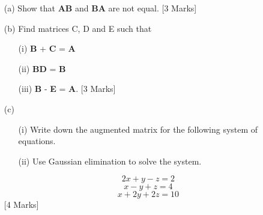 \documentclass[a4paper,12pt]{article}
\begin{document}
\begin{itemize}
\item[(a)] Show that \textbf{AB} and \textbf{BA} are not equal. [3 Marks]
\item[(b)] Find matrices C, D and E such that
\begin{itemize}
\item[(i)] \textbf{B} + \textbf{C} = \textbf{A}
\item[(ii)] \textbf{BD} = \textbf{B}
\item[(iii)] \textbf{B} - \textbf{E} = \textbf{A}. [3 Marks]
\end{itemize}


\item[(c)]

\begin{itemize}
\item[(i)] Write down the augmented matrix for the following system of equations.
\item[(ii)] Use Gaussian elimination to solve the system. 
\end{itemize}
\[2x + y - z = 2\]
\[x - y + z = 4\]
\[x + 2y + 2z = 10\]
[4 Marks]
\end{itemize}
\end{document}
